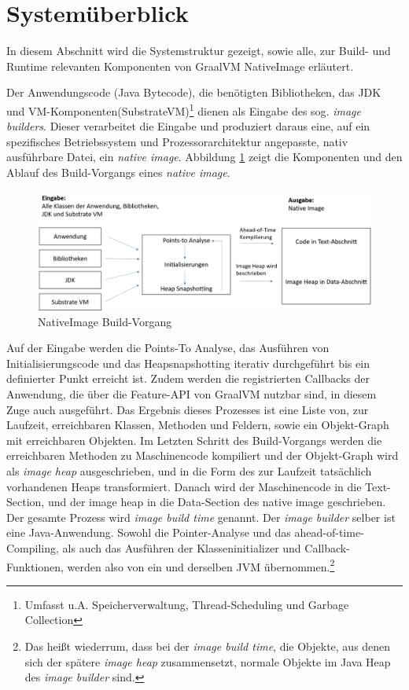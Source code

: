\section{Systemüberblick}
\label{sec:system}
In diesem Abschnitt wird die Systemstruktur gezeigt, sowie alle, zur Build- und Runtime relevanten Komponenten von GraalVM NativeImage erläutert.

Der Anwendungscode (Java Bytecode), die benötigten Bibliotheken, das JDK und VM-Komponenten(SubstrateVM)\footnote{Umfasst u.A. Speicherverwaltung, Thread-Scheduling und Garbage Collection} dienen als Eingabe des sog. \textit{image builders}. Dieser verarbeitet die Eingabe und produziert daraus eine, auf ein spezifisches Betriebssystem und Prozessorarchitektur angepasste, nativ ausführbare Datei, ein \textit{native image}. 
Abbildung \ref{fig:system_buildtime} zeigt die Komponenten und den Ablauf des Build-Vorgangs eines \textit{native image}.

\begin{figure}[ht]
	\centering
	\includegraphics[width=1\textwidth]{resources/GraalVM_BuildTime.png}
	\caption{NativeImage Build-Vorgang}
	\label{fig:system_buildtime}
\end{figure}

Auf der Eingabe werden die Points-To Analyse, das Ausführen von Initialisierungscode und das Heapsnapshotting iterativ durchgeführt bis ein definierter Punkt erreicht ist. 
Zudem werden die registrierten Callbacks der Anwendung, die über die Feature-API von GraalVM nutzbar sind, in diesem Zuge auch ausgeführt. Das Ergebnis dieses Prozesses ist eine Liste von, zur Laufzeit, erreichbaren Klassen, Methoden und Feldern, sowie ein Objekt-Graph mit erreichbaren Objekten. Im Letzten Schritt des Build-Vorgangs werden die erreichbaren Methoden zu Maschinencode kompiliert und der Objekt-Graph wird als \textit{image heap} ausgeschrieben, und in die Form des zur Laufzeit tatsächlich vorhandenen Heaps transformiert. Danach wird der Maschinencode 
 in die Text-Section, und der image heap in die Data-Section \parencite[Fig. 1-13]{TISC1995} des native image geschrieben. Der gesamte Prozess wird \textit{image build time} genannt\parencite{Wimmer2019}.
Der \textit{image builder} selber ist eine Java-Anwendung. Sowohl die Pointer-Analyse 
und das ahead-of-time-Compiling, als auch das Ausführen der Klasseninitializer und Callback-Funktionen, werden also von ein und derselben JVM
 übernommen\textit{}.\footnote{Das heißt wiederrum, dass bei der \textit{image build time}, die Objekte, aus denen sich der spätere \textit{image heap} zusammensetzt,
 normale Objekte im Java Heap des \textit{image builder} sind.}
